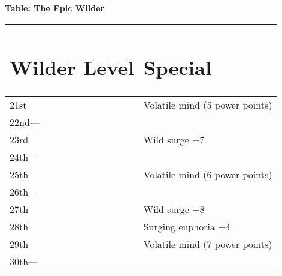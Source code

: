 \documentclass{article}
\begin{document}
\textbf{Table: The Epic Wilder }

\begin{tabular}{|>{\raggedright}p{38pt}|>{\raggedright}p{127pt}|}
\hline
\section*{W\textbf{ilder Level}} & \section*{S\textbf{pecial }}\tabularnewline
\hline
21st & Volatile mind (5 power points)\tabularnewline
\hline
22nd--- &  \tabularnewline
\hline
23rd &  Wild surge +7\tabularnewline
\hline
24th--- &  \tabularnewline
\hline
25th & Volatile mind (6 power points)\tabularnewline
\hline
26th--- & \tabularnewline
\hline
27th & Wild surge +8\tabularnewline
\hline
28th & Surging euphoria +4 \tabularnewline
\hline
29th & Volatile mind (7 power points)\tabularnewline
\hline
30th--- &  \tabularnewline
\hline
\end{tabular}

\newpage
\end{document}
